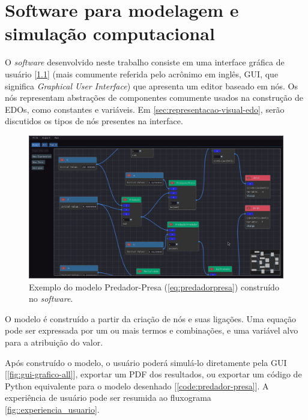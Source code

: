 \documentclass[
	12pt,				%
	openright,			%
	oneside,			%
	a4paper,			%
	main=brazil,
	english,			%
	]{ufsj-abntex2}
\begin{document}
\chapter{Software para modelagem e simulação computacional}
\label{chap:metodologia}
\label{chap:software-para-modelagem}

O \textit{software} desenvolvido neste trabalho consiste em uma interface gráfica de usuário [\ref{fig:gui-predador-presa}] (mais comumente referida pelo acrônimo em inglês, GUI, que significa \textit{Graphical User Interface}) que apresenta um editor baseado em nós. Os nós representam abstrações de componentes comumente usados na construção de EDOs, como constantes e variáveis. Em \ref{sec:representacao-visual-edo}, serão discutidos os tipos de nós presentes na interface.

\begin{figure}[h]
    \centering
    \includegraphics[scale=0.35]{imgs/ode-designer/predador-presa.png} 
    \caption{Exemplo do modelo Predador-Presa (\ref{eq:predadorpresa}) construído no \textit{software}.}
    \label{fig:gui-predador-presa}
\end{figure}

O modelo é construído a partir da criação de nós e suas ligações. Uma equação pode ser expressada por um ou mais termos e combinações, e uma variável alvo para a atribuição do valor.

Após construído o modelo, o usuário poderá simulá-lo diretamente pela GUI [\ref{fig:gui-grafico-all}], exportar um PDF dos resultados, ou exportar um código de Python equivalente para o modelo desenhado [\ref{code:predador-presa}]. A experiência de usuário pode ser resumida ao fluxograma \ref{fig::experiencia_usuario}.
\end{document}
